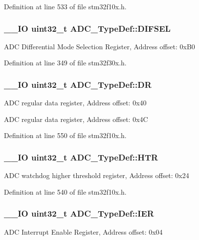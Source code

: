 Definition at line 533 of file stm32f10x.\-h.

\hypertarget{struct_a_d_c___type_def_a6c97f0e1681230af109fddac27de9271}{
\subsubsection[{D\-I\-F\-S\-E\-L}]{\setlength{\rightskip}{0pt plus 5cm}\-\_\-\-\_\-\-I\-O {\bf uint32\-\_\-t} A\-D\-C\-\_\-\-Type\-Def\-::\-D\-I\-F\-S\-E\-L}}\label{struct_a_d_c___type_def_a6c97f0e1681230af109fddac27de9271}
A\-D\-C Differential Mode Selection Register, Address offset\-: 0x\-B0 

Definition at line 349 of file stm32f30x.\-h.

\hypertarget{struct_a_d_c___type_def_a84114accead82bd11a0e12a429cdfed9}{
\subsubsection[{D\-R}]{\setlength{\rightskip}{0pt plus 5cm}\-\_\-\-\_\-\-I\-O {\bf uint32\-\_\-t} A\-D\-C\-\_\-\-Type\-Def\-::\-D\-R}}\label{struct_a_d_c___type_def_a84114accead82bd11a0e12a429cdfed9}
A\-D\-C regular data register, Address offset\-: 0x40

A\-D\-C regular data register, Address offset\-: 0x4\-C 

Definition at line 550 of file stm32f10x.\-h.

\hypertarget{struct_a_d_c___type_def_a297ac2d83a1837bfdc0333474b977de0}{
\subsubsection[{H\-T\-R}]{\setlength{\rightskip}{0pt plus 5cm}\-\_\-\-\_\-\-I\-O {\bf uint32\-\_\-t} A\-D\-C\-\_\-\-Type\-Def\-::\-H\-T\-R}}\label{struct_a_d_c___type_def_a297ac2d83a1837bfdc0333474b977de0}
A\-D\-C watchdog higher threshold register, Address offset\-: 0x24 

Definition at line 540 of file stm32f10x.\-h.

\hypertarget{struct_a_d_c___type_def_a78d24b9deed83e90a2ff96c95ba94934}{
\subsubsection[{I\-E\-R}]{\setlength{\rightskip}{0pt plus 5cm}\-\_\-\-\_\-\-I\-O {\bf uint32\-\_\-t} A\-D\-C\-\_\-\-Type\-Def\-::\-I\-E\-R}}\label{struct_a_d_c___type_def_a78d24b9deed83e90a2ff96c95ba94934}
A\-D\-C Interrupt Enable Register, Address offset\-: 0x04 

